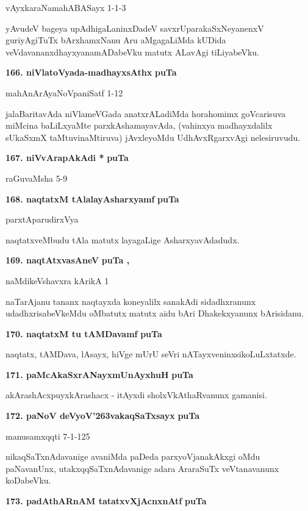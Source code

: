 \hfill{vAyxkaraNamahABASayx 1-1-3}

\smallskip
yAvudeV bageya upAdhigaLaninxDadeV savxrUparakaSxNeyanenxV guriyAgiTuTx bArxhamxNanu Aru aMgagaLiMda kUDida veVdavananxdhayxyanamADabeVku matutx ALavAgi tiLiyabeVku.

\medskip
\noindent
\textbf{166. niVlatoVyada-madhayxsAthx} \hfill{\bf puTa \pageref{166a}}

\hfill{mahAnArAyaNoVpaniSatf 1-12}

\smallskip
jalaBaritavAda niVlameVGada anatxrALadiMda horahomimx goVcarisuva miMcina baLiLxyaMte parxkAshamayavAda, (vahinxya madhayxdalilx sUkaSxmX taMtuvinaMtiruva) jAvxleyoMdu UdhAvxRgarxvAgi nelesiruvudu.

\medskip
\noindent
\textbf{167. niVvArapAkAdi *} \hfill{\bf puTa \pageref{57a}}

\hfill{raGuvaMsha 5-9}

\eject

\noindent
\textbf{168. naqtatxM tAlalayAsharxyamf} \hfill{\bf puTa \pageref{249}}

\hfill{parxtAparudirxVya}

\smallskip
naqtatxveMbudu tAla matutx layagaLige AsharxyavAdadudx.

\medskip
\noindent
\textbf{169. naqtAtxvasAneV} \hfill{\bf puTa \pageref{40d}, \pageref{152b}}

\hfill{naMdikeVshavxra kArikA 1}

\smallskip
naTarAjanu tananx naqtayxda koneyalilx sanakAdi sidadhxranunx udadhxrisabeVkeMdu oMbatutx matutx aidu bAri Dhakekxyanunx bArisidanu.

\medskip
\noindent
\textbf{170. naqtatxM tu tAMDavamf} \hfill{\bf puTa \pageref{241a}}

\smallskip
naqtatx, tAMDava, lAsayx, hiVge mUrU seVri nATayxveninxsikoLuLxtatxde.

\medskip
\noindent
\textbf{171. paMcAkaSxrANayxmUnAyxhuH} \hfill{\bf puTa \pageref{161}}

\smallskip
akArashAcxpuyxkArashacx - itAyxdi sholxVkAthaRvanunx gamanisi.

\medskip
\noindent
\textbf{172. paNoV deVyoV\char'263vakaqSaTxsayx} \hfill{\bf puTa \pageref{223b}}

\hfill{manusamxqqti 7-1-125}

\smallskip
nikaqSaTxnAdavanige avaniMda paDeda parxyoVjanakAkxgi oMdu paNavanUnx, utakxqqSaTxnAdavanige adara AraraSuTx veVtanavanunx koDabeVku.

\medskip
\noindent
\textbf{173. padAthARnAM tatatxvXjAcnxnAtf} \hfill{\bf puTa \pageref{41b}}

